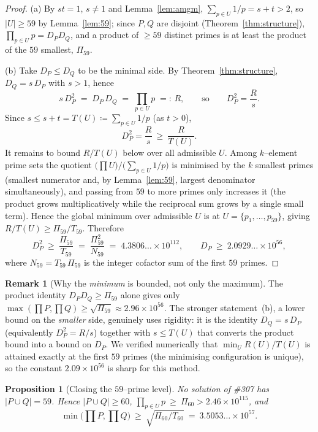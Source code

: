 \documentclass[11pt]{article}
\newtheorem{proposition}[theorem]{Proposition}
\theoremstyle{definition}
\newtheorem{remark}[theorem]{Remark}
\begin{document}
\begin{proof}
(a) By $st=1$, $s\ne1$ and Lemma~\ref{lem:amgm}, $\sum_{p\in U}1/p=s+t>2$, so $|U|\ge 59$ by
Lemma~\ref{lem:59}; since $P,Q$ are disjoint (Theorem~\ref{thm:structure}),
$\prod_{p\in U}p=D_PD_Q$, and a product of $\ge 59$ distinct primes is at least the product of the
$59$ smallest, $\Pi_{59}$.

(b) Take $D_P\le D_Q$ to be the minimal side. By Theorem~\ref{thm:structure}, $D_Q=s\,D_P$ with
$s>1$, hence
\[
s\,D_P^2 \;=\; D_P\,D_Q \;=\; \prod_{p\in U}p \;=\!:\, R,
\qquad\text{so}\qquad D_P^2=\frac{R}{s}.
\]
Since $s\le s+t=T(U)\coloneqq\sum_{p\in U}1/p$ (as $t>0$),
\[
D_P^2=\frac{R}{s}\ \ge\ \frac{R}{T(U)}.
\]
It remains to bound $R/T(U)$ below over all admissible $U$. Among $k$--element prime sets the
quotient $\bigl(\prod U\bigr)\big/\bigl(\sum_{p\in U}1/p\bigr)$ is minimised by the $k$ smallest
primes (smallest numerator and, by Lemma~\ref{lem:59}, largest denominator simultaneously), and
passing from $59$ to more primes only increases it (the product grows multiplicatively while the
reciprocal sum grows by a single small term). Hence the global minimum over admissible $U$ is at
$U=\{p_1,\dots,p_{59}\}$, giving $R/T(U)\ge \Pi_{59}/T_{59}$. Therefore
\[
D_P^2 \ \ge\ \frac{\Pi_{59}}{T_{59}} \;=\; \frac{\Pi_{59}^2}{N_{59}}\;=\;4.3806\ldots\times10^{112},
\qquad D_P\ \ge\ 2.0929\ldots\times10^{56},
\]
where $N_{59}=T_{59}\,\Pi_{59}$ is the integer cofactor sum of the first $59$ primes.
\end{proof}

\begin{remark}[Why the \emph{minimum} is bounded, not only the maximum]
The product identity $D_PD_Q\ge\Pi_{59}$ alone gives only $\max(\prod P,\prod Q)\ge
\sqrt{\Pi_{59}}\approx2.96\times10^{56}$. The stronger statement~(b), a lower bound on the
\emph{smaller} side, genuinely uses rigidity: it is the identity $D_Q=s\,D_P$ (equivalently
$D_P^2=R/s$) together with $s\le T(U)$ that converts the product bound into a bound on $D_P$. We
verified numerically that $\min_U R(U)/T(U)$ is attained exactly at the first $59$ primes (the
minimising configuration is unique), so the constant $2.09\times10^{56}$ is sharp for this method.
\end{remark}

\begin{proposition}[Closing the $59$--prime level]\label{prop:close59}
No solution of \#307 has $|P\cup Q|=59$. Hence $|P\cup Q|\ge60$,
$\prod_{p\in U}p\ \ge\ \Pi_{60}>2.46\times10^{115}$, and
\[ \min\bigl(\textstyle\prod P,\prod Q\bigr)\ \ge\ \sqrt{\Pi_{60}/T_{60}}\ =\
3.5053\ldots\times10^{57}. \]
\end{proposition}
\end{document}
